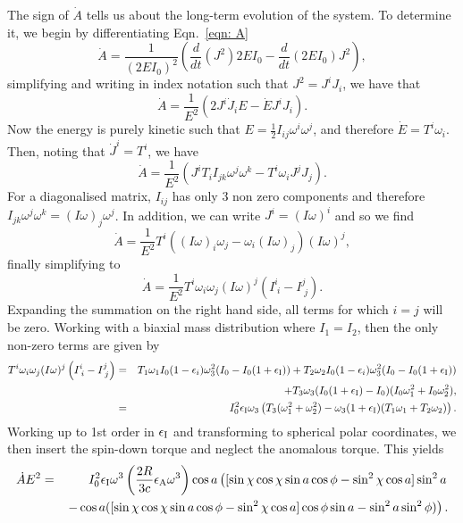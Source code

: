 \documentclass[../full_thesis/full_thesis.tex]{subfiles}
\begin{document}
The sign of $\dot{A}$ tells us about the long-term evolution of the system. To
determine it, we begin by differentiating Eqn.~\eqref{eqn: A}
\begin{equation}
\dot{A}=\frac{1}{(2EI_{0})^{2}}
        \left(\frac{d}{dt}(J^{2})2EI_{0}-\frac{d}{dt}(2EI_{0})J^{2}\right),
\end{equation}
simplifying and writing in index notation such that $J^{2}=J^iJ_i$, we have that
\begin{equation}
\dot{A}=\frac{1}{E^{2}}\left(2J^{i}\dot{J}_{i}E-\dot{E}J^{i}J_{i}\right).
\end{equation}
Now the energy is purely kinetic such that
$E=\frac{1}{2}I_{ij}\omega^{i}\omega^{j}$, and therefore $\dot{E}=T^{i}\omega_{i}$.
Then, noting that $\dot{J}^{i}=T^{i}$, we have
\begin{equation}
\dot{A}=\frac{1}{E^{2}}\left(J^{i}T_{i}I_{jk}\omega^{j}\omega^{k}
                             -T^{i}\omega_{i}J^{j}J_{j}\right).
\end{equation}
For a diagonalised matrix, $I_{ij}$ has only 3 non zero components and therefore
$I_{jk}\omega^{j}\omega^{k}=(I\omega)_{j}\omega^{j}$. In addition, we can write
$J^{i}=(I\omega)^{i}$ and so we find
\begin{equation}
\dot{A}=\frac{1}{E^{2}}T^{i}\left((I\omega)_{i}\omega_{j}
        -\omega_{i}(I\omega)_{j}\right)(I\omega)^{j},
\end{equation}
finally simplifying to
\begin{equation}
\dot{A}=\frac{1}{E^{2}}T^{i}\omega_{i}\omega_{j}
        (I\omega)^{j}\left(I^{i}_{\;i}-I^{j}_{\;j}\right).
\end{equation}
Expanding the
summation on the right hand side, all terms for which $i=j$ will be zero. Working with a biaxial mass
distribution where $I_{1}=I_{2}$, then the only non-zero terms are given by
\begin{eqnarray*}
T^{i}\omega_{i}\omega_{j}(I\omega)^{j}\left(I^{i}_{\;i}-I^{j}_{\;j}\right)&=&
T_{1}\omega_{1}I_{0}(1-\epsilon_{i})\omega^{2}_{3}
(I_{0}-I_{0}(1+\epsilon_{\mathrm{I}}))+
T_{2}\omega_{2}I_{0}(1-\epsilon_{i})\omega^{2}_{3}(I_{0}-I_{0}(1+\epsilon_{\mathrm{I}}))
\\ && +
T_{3}\omega_{3}(I_{0}(1+\epsilon_{\mathrm{I}})-I_{0})
               (I_{0}\omega_{1}^{2}+I_{0}\omega_{2}^{2}), \\
&=& I_{0}^{2}\epsilon_{\mathrm{I}}\omega_{3}\left(T_{3}(\omega_{1}^{2}+\omega_{2}^{2})
    - \omega_{3}(1+\epsilon_{\mathrm{I}})(T_{1}\omega_{1}+T_{2}\omega_{2})\right).
\end{eqnarray*}
Working up to 1st order in $\epsilon_{\mathrm{I}}$ and transforming to spherical polar
coordinates, we then insert the spin-down torque and neglect the anomalous torque.
This yields
\begin{eqnarray*}
\dot{A}E^{2}&=& I_{0}^{2}\epsilon_{\mathrm{I}}\omega^{3}
    \left(\frac{2R}{3c}\epsilon_{\mathrm{A}}\omega^{3}\right)
    \cos a \left([\sin \chi \cos \chi \sin a \cos \phi
                 - \sin^{2}\chi \cos a]\sin^{2} a \right. \\
&& \left.- \cos a ([\sin \chi \cos \chi \sin a \cos \phi
                   - \sin^{2}\chi \cos a]\cos \phi \sin a
                   - \sin^{2}a \sin^{2}\phi)\right).
\end{eqnarray*}
\end{document}
